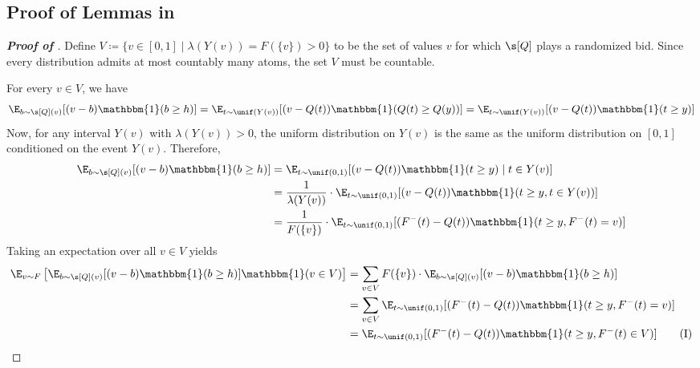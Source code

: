 \subsection{Proof of Lemmas in }\label{appendix:minimax-lemmas}

\begin{proof}[\textbf{Proof of }]
	Define $V \coloneqq \{v \in[0,1] \mid \lambda(Y(v)) = F(\{v\}) > 0\}$ to be the set of values $v$ for which $\s[Q]$ plays a randomized bid. Since every distribution admits at most countably many atoms, the set $V$ must be countable.
	
	For every $v \in V$, we have
	\begin{align*}
		\E_{b \sim \s[Q](v)} [(v - b) \mathbbm{1}(b \geq h)] = \E_{t \sim \unif(Y(v))}[(v - Q(t))\mathbbm{1}(Q(t) \geq Q(y))] = \E_{t \sim \unif(Y(v))}[(v - Q(t))\mathbbm{1}(t \geq y)]
	\end{align*}
	Now, for any interval $Y(v)$ with $\lambda(Y(v))> 0$, the uniform distribution on $Y(v)$ is the same as the uniform distribution on $[0,1]$ conditioned on the event $Y(v)$. Therefore,
	\begin{align*}
		\E_{b \sim \s[Q](v)} [(v - b) \mathbbm{1}(b \geq h)] &= \E_{t \sim \unif(0,1)}[(v - Q(t))\mathbbm{1}(t \geq y) \mid t \in Y(v)]\\
		&= \frac{1}{\lambda(Y(v))} \cdot \E_{t \sim \unif(0,1)}[(v - Q(t))\mathbbm{1}(t \geq y,  t \in Y(v))]\\
		&= \frac{1}{F(\{v\})} \cdot \E_{t \sim \unif(0,1)}[(F^-(t) - Q(t))\mathbbm{1}(t \geq y,  F^-(t) = v)]
	\end{align*}
	Taking an expectation over all $v \in V$ yields
	\begin{align*}
		\E_{v \sim F}\left[ \E_{b \sim \s[Q](v)} [(v - b) \mathbbm{1}(b \geq h)] \mathbbm{1}(v \in V) \right] &= \sum_{v \in V} F(\{v\}) \cdot \E_{b \sim \s[Q](v)} [(v - b) \mathbbm{1}(b \geq h)]\\
		&= \sum_{v \in V} \E_{t \sim \unif(0,1)}[(F^-(t) - Q(t))\mathbbm{1}(t \geq y,  F^-(t) = v)]\\
		&= \E_{t \sim \unif(0,1)}[(F^-(t) - Q(t))\mathbbm{1}(t \geq y,  F^-(t) \in V)] \tag{I}
	\end{align*}
	

\end{proof}
